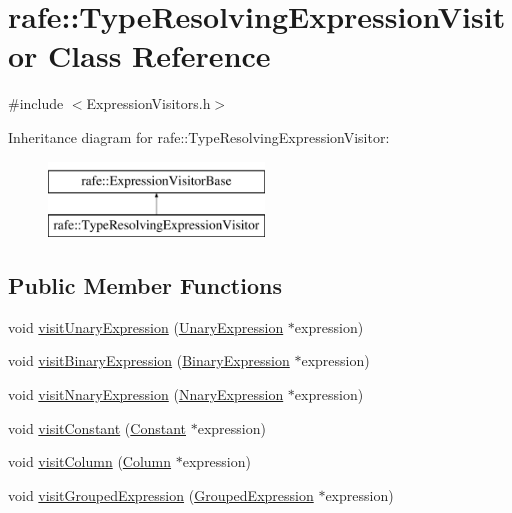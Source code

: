\hypertarget{classrafe_1_1_type_resolving_expression_visitor}{\section{rafe\+:\+:Type\+Resolving\+Expression\+Visitor Class Reference}
\label{classrafe_1_1_type_resolving_expression_visitor}
}


{\ttfamily \#include $<$Expression\+Visitors.\+h$>$}

Inheritance diagram for rafe\+:\+:Type\+Resolving\+Expression\+Visitor\+:\begin{figure}[H]
\begin{center}
\leavevmode
\includegraphics[height=2.000000cm]{classrafe_1_1_type_resolving_expression_visitor}
\end{center}
\end{figure}
\subsection*{Public Member Functions}
\begin{DoxyCompactItemize}
\item 
void \hyperlink{classrafe_1_1_type_resolving_expression_visitor_ae14bae4b659f64615fc38c996828e19d}{visit\+Unary\+Expression} (\hyperlink{classrafe_1_1_unary_expression}{Unary\+Expression} $\ast$expression)
\item 
void \hyperlink{classrafe_1_1_type_resolving_expression_visitor_a3a46e7e142337f41960395c8e1fc773a}{visit\+Binary\+Expression} (\hyperlink{classrafe_1_1_binary_expression}{Binary\+Expression} $\ast$expression)
\item 
void \hyperlink{classrafe_1_1_type_resolving_expression_visitor_a78e0e725ec8c3add1156949df6a86252}{visit\+Nnary\+Expression} (\hyperlink{classrafe_1_1_nnary_expression}{Nnary\+Expression} $\ast$expression)
\item 
void \hyperlink{classrafe_1_1_type_resolving_expression_visitor_af4d0c76b55893e462c12ce165dcb4275}{visit\+Constant} (\hyperlink{classrafe_1_1_constant}{Constant} $\ast$expression)
\item 
void \hyperlink{classrafe_1_1_type_resolving_expression_visitor_a89cc0145ce0d723da377fac1996067bf}{visit\+Column} (\hyperlink{classrafe_1_1_column}{Column} $\ast$expression)
\item 
void \hyperlink{classrafe_1_1_type_resolving_expression_visitor_a08c282c4872c03ee57f361e1f0843566}{visit\+Grouped\+Expression} (\hyperlink{classrafe_1_1_grouped_expression}{Grouped\+Expression} $\ast$expression)
\end{DoxyCompactItemize}
